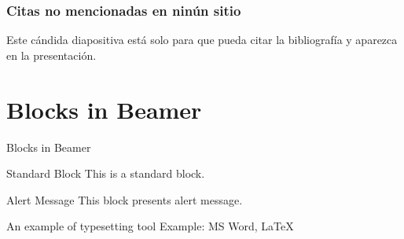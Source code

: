 \documentclass{beamer}
\begin{document}
\begin{frame}
    \frametitle{Citas no mencionadas en ninún sitio}

    Este cándida diapositiva está solo para que pueda citar la 
    bibliografía y aparezca en la presentación. 
    \cite{MostafaLearningFromData}
    \cite{the-elements-of-real-analysis}

\end{frame}



\section{Blocks in Beamer}
\begin{frame}{Blocks in Beamer}
    \begin{block}{Standard Block}
        This is a standard block.
    \end{block}
    \begin{alertblock}{Alert Message}
        This block presents alert message.
    \end{alertblock}
    \begin{exampleblock}{An example of typesetting tool}
        Example: MS Word, \LaTeX{}
    \end{exampleblock}
\end{frame}
\end{document}
